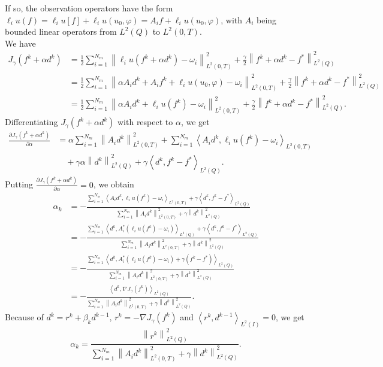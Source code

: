 \documentclass[]{article}
\begin{document}
\noindent If so, the observation operators have the form $\ell_i u(f)=\ell_i u[f]+\ell_i u(u_0, \varphi)=A_if+\ell_i u(u_0, \varphi)$, with $A_i$ being bounded linear operators from $L^2(Q)$ to $L^2(0, T)$.\\
We have
\begin{align*}
	J_{\gamma}(f^k+\alpha d^k)&=\frac{1}{2}\sum_{i=1}^{N_m}\left\|\ell_i u(f^k+\alpha d^k)-\omega_i\right\|_{L^2(0, T)}^2+\frac{\gamma}{2}\left\|f^k+\alpha d^k-f^*\right\|_{L^2(Q)}^2\\[0.2cm]
	&=\frac{1}{2}\sum_{i=1}^{N_m}\left\|\alpha A_id^k+A_if^k+\ell_i u(u_0, \varphi)-\omega_i\right\|_{L^2(0, T)}^2+\frac{\gamma}{2}\left\|f^k+\alpha d^k-f^*\right\|_{L^2(Q)}^2\\[0.2cm]
	&=\frac{1}{2}\sum_{i=1}^{N_m}\left\|\alpha A_id^k+\ell_i u(f^k)-\omega_i\right\|_{L^2(0, T)}^2+\frac{\gamma}{2}\left\|f^k+\alpha d^k-f^*\right\|_{L^2(Q)}^2.
\end{align*}
Differentiating $J_\gamma(f^k+\alpha d^k)$ with respect to $\alpha$, we get
\begin{align*}
	\frac{\partial J_\gamma(f^k+\alpha d^k)}{\partial \alpha} &= \alpha\sum_{i=1}^{N_m}\left\|A_id^k \right\|_{L^2(0, T)}^2+\sum_{i=1}^{N_m}\left\langle A_id^k,\ell_i u(f^k)-\omega_i\right\rangle_{L^2(0, T)}\\[0.2cm]
	&\quad+\gamma\alpha\left\| d^k\right\|_{L^2(Q)}^2+\gamma\left\langle d^k, f^k-f^*\right\rangle_{L^2(Q)}.
\end{align*}
Putting $\frac{\partial J_\gamma(f^k+\alpha d^k)}{\partial \alpha}=0$, we obtain
\begin{align*}
	\alpha_k&=-\frac{\sum_{i=1}^{N_m}\left\langle A_id^k, \ell_i u(f^k)-\omega_i\right\rangle_{L^2(0, T)}+\gamma\left\langle d^k, f^k-f^*\right\rangle_{L^2(Q)}}{\sum_{i=1}^{N_m}\left\|A_id^k\right\|^2_{L^2(0, T)}+\gamma\left\|d^k\right\|^2_{L^2(Q)}}\\[0.2cm]
	&=-\frac{\sum_{i=1}^{N_m}\left\langle d^k, A_i^*\left(\ell_i u(f^k)-\omega_i\right)\right\rangle_{L^2(Q)}+\gamma\left\langle d^k, f^k-f^*\right\rangle_{L^2(Q)}}{\sum_{i=1}^{N_m}\left\|A_id^k\right\|^2_{L^2(0, T)}+\gamma\left\|d^k\right\|^2_{L^2(Q)}}\\[0.2cm]
	&=-\frac{\sum_{i=1}^{N_m}\left\langle d^k, A_i^*\left(\ell_i u(f^k)-\omega_i\right)+\gamma(f^k-f^*)\right\rangle_{L^2(Q)}}{\sum_{i=1}^{N_m}\left\|A_id^k\right\|^2_{L^2(0, T)}+\gamma\left\|d^k\right\|^2_{L^2(Q)}}\\[0.2cm]
	&=-\frac{\left\langle d^k,\nabla J_\gamma(f^k)\right\rangle_{L^2(Q)}}{\sum_{i=1}^{N_m}\left\|A_id^k\right\|^2_{L^2(0, T)}+\gamma\left\|d^k\right\|^2_{L^2(Q)}}.
\end{align*}
Because of $d^k=r^k+\beta_kd^{k-1},\, r^k=-\nabla J_\gamma (f^k)$ and $\left\langle r^k,d^{k-1}\right\rangle_{L^2(I)}=0$, we get 
$$\alpha_k=\frac{\left\|r^k\right\|^2_{L^2(Q)}}{\sum_{i=1}^{N_m}\left\|A_id^k\right\|^2_{L^2(0, T)}+\gamma\left\|d^k\right\|^2_{L^2(Q)}}.$$
\end{document}
